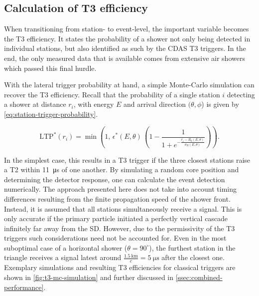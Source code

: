\subsection{Calculation of T3 efficiency}
\label{ssec:t3-calculation}

When transitioning from station- to event-level, the important variable becomes the T3 efficiency. It states the probability of a shower not only being detected
in individual stations, but also identified as such by the CDAS T3 triggers. In the end, the only measured data that is available comes from extensive air showers
which passed this final hurdle.

With the lateral trigger probability at hand, a simple Monte-Carlo simulation can recover the T3 efficiency. Recall that the probability of a single station $i$
detecting a shower at distance $r_i$, with energy $E$ and arrival direction $(\theta, \phi$) is given by \autoref{eq:station-trigger-probability}.

\begin{equation}
	\label{eq:station-trigger-probability}
	\text{LTP}^*(r_i) = \min\left(1,\,\epsilon^*(E, \theta)\,\left(1 - \frac{1}{1+e^{-\frac{r_i-R_0(E, \theta)}{\sigma_R(E, \theta)}}}\right)\right).
\end{equation}

In the simplest case, this results in a T3 trigger if the three closest stations raise a T2 within \SI{11}{\micro\second} of one another. By simulating a random
core position and determining the detector response, one can calculate the event detection numerically. The approach presented here does not take into account 
timing differences resulting from the finite propagation speed of the shower front. Instead, it is assumed that all stations simultaneously receive a signal. This
is only accurate if the primary particle initiated a perfectly vertical cascade infinitely far away from the SD. However, due to the permissivity of the T3 
triggers such considerations need not be accounted for. Even in the most suboptimal case of a horizontal shower ($\theta = 90^\circ$), the furthest station in the 
triangle receives a signal latest around $\frac{\SI{1.5}{\kilo\meter}}{c} = \SI{5}{\micro\second}$ after the closest one. Exemplary simulations and resulting T3 
efficiencies for classical triggers are shown in \autoref{fig:t3-mc-simulation} and further discussed in \autoref{ssec:combined-performance}.


